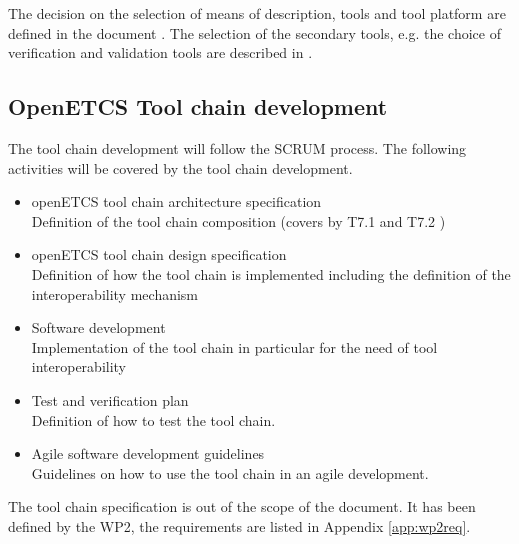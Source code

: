 The decision on the selection of means of description, tools and tool platform
are defined in the document \cite{D7.1}. The selection of the secondary tools,
e.g. the choice of verification and validation tools are described in \cite{D7.2}.

\subsection{OpenETCS Tool chain development}
The tool chain development will follow the SCRUM process.
The following activities will be covered  by the tool chain development.
\begin{itemize}
\item openETCS tool chain architecture specification\\
Definition of the tool chain composition (covers by T7.1 \cite{D7.1}
and T7.2 \cite{D7.2})
\item openETCS tool chain design specification \\
Definition of how the tool chain is implemented including the
definition of the interoperability mechanism
\item Software development\\
Implementation of the tool chain in particular for the need of tool interoperability
\item Test and verification plan\\
Definition of how to test the tool chain.
\item Agile software development guidelines\\
Guidelines on how to use the tool chain in an agile development.
\end{itemize}

The tool chain specification is out of the scope of the document. It
has been defined by the WP2, the requirements are listed in Appendix \ref{app:wp2req}.
 	

